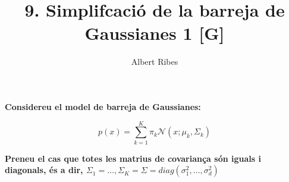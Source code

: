 \documentclass[a5paper]{article}
\title{9. Simplifcació de la barreja de Gaussianes 1 [G]}
\author{Albert Ribes}
\begin{document}
\maketitle

%


\textbf{
Considereu el model de barreja de Gaussianes:
}

\begin{equation*}
p(x) = \sum_{k = 1}^{K} \pi_k \mathcal{N}(x; \mu_k, \Sigma_k)
\end{equation*}

\textbf{
Preneu el cas que totes les matrius de covariança són iguals i diagonals, és a dir, $\Sigma_1 = \dots, \Sigma_K = \Sigma = diag(\sigma_1^2,\dots, \sigma_d^2)$
}
\end{document}
